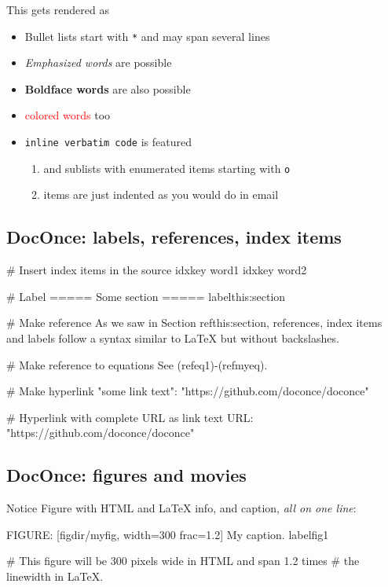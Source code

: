 \documentclass[%
oneside,                 %
final,                   %
10pt]{article}
\newcounter{doconce:movie:counter}
\begin{document}
This gets rendered as
\begin{itemize}
 \item Bullet lists start with \texttt{*}
   and may span several lines
 \item \emph{Emphasized words} are possible
 \item \textbf{Boldface words} are also possible
 \item \textcolor{red}{colored words} too
 \item \texttt{inline verbatim code} is featured
\begin{enumerate}
  \item and sublists with enumerated items starting with \texttt{o}
  \item items are just indented as you would do in email
\end{enumerate}
\noindent
\end{itemize}
\noindent
\subsection{DocOnce: labels, references, index items}
\bdo
# Insert index items in the source
idx{key word1} idx{key word2}

# Label
===== Some section =====
label{this:section}

# Make reference
As we saw in Section ref{this:section}, references, index
items and labels follow a syntax similar to LaTeX
but without backslashes.

# Make reference to equations
See (ref{eq1})-(ref{myeq}).

# Make hyperlink
"some link text": "https://github.com/doconce/doconce"

# Hyperlink with complete URL as link text
URL: "https://github.com/doconce/doconce"

\edo

\subsection{DocOnce: figures and movies}
\begin{block}{Notice}
Figure with HTML and {\LaTeX} info, and caption, \emph{all on one line}:
\end{block}
\bccq
FIGURE: [figdir/myfig, width=300 frac=1.2] My caption. label{fig1}

# This figure will be 300 pixels wide in HTML and span 1.2 times
# the linewidth in LaTeX.

\eccq
\end{document}
